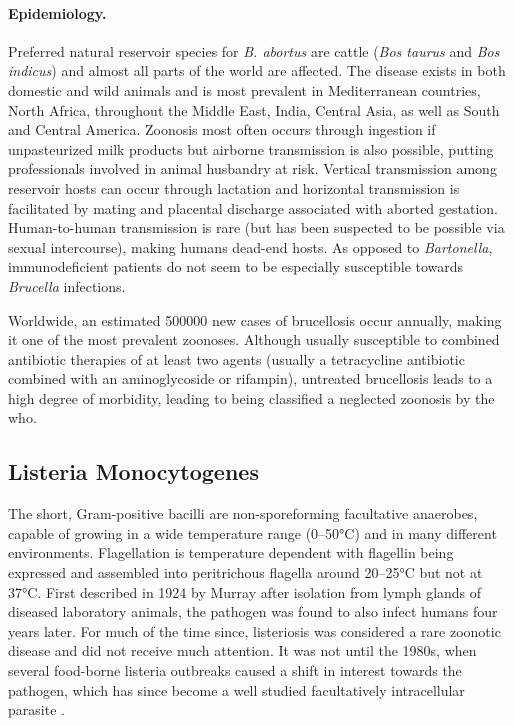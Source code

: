 \paragraph{Epidemiology.}
Preferred natural reservoir species for \textit{B. abortus} are cattle (\textit{Bos taurus} and \textit{Bos indicus}) and almost all parts of the world are affected. The disease exists in both domestic and wild animals and is most prevalent in Mediterranean countries, North Africa, throughout the Middle East, India, Central Asia, as well as South and Central America. Zoonosis most often occurs through ingestion if unpasteurized milk products but airborne transmission is also possible, putting professionals involved in animal husbandry at risk. Vertical transmission among reservoir hosts can occur through lactation and horizontal transmission is facilitated by mating and placental discharge associated with aborted gestation. Human-to-human transmission is rare (but has been suspected to be possible via sexual intercourse), making humans dead-end hosts. As opposed to \textit{Bartonella}, immunodeficient patients do not seem to be especially susceptible towards \textit{Brucella} infections.


Worldwide, an estimated 500000 new cases of brucellosis occur annually, making it one of the most prevalent zoonoses. Although usually susceptible to combined antibiotic therapies of at least two agents (usually a tetracycline antibiotic combined with an aminoglycoside or rifampin), untreated brucellosis leads to a high degree of morbidity, leading to being classified a neglected zoonosis by the \gls{who}.

\subsection{Listeria Monocytogenes}

The short, Gram-positive bacilli are non-sporeforming facultative anaerobes, capable of growing in a wide temperature range (0--50\si{\degree}C) and in many different environments. Flagellation is temperature dependent with flagellin being expressed and assembled into peritrichous flagella around 20--25\si{\degree}C but not at 37\si{\degree}C. First described in 1924 by Murray after isolation from lymph glands of diseased laboratory animals, the pathogen was found to also infect humans four years later. For much of the time since, listeriosis was considered a rare zoonotic disease and did not receive much attention. It was not until the 1980s, when several food-borne listeria outbreaks caused a shift in interest towards the pathogen, which has since become a well studied facultatively intracellular parasite \citep{Farber1991}.


